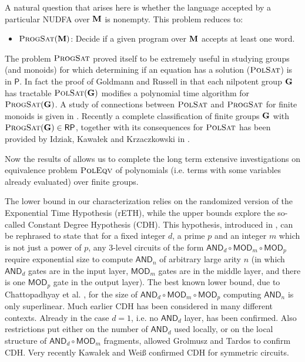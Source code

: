 \documentclass[11pt,a4paper]{amsart}
\newcommand{\polsat}[1]{\textsc{PolSat}\left( {\m #1} \right)}
\newcommand{\ptime}{\textsf{P}\xspace}
\newcommand{\rptime}{\textsf{RP}\xspace}
\newcommand{\m}[1]{{\uppercase {\bf{#1}}}}
\newcommand{\gProblem}[2]{\ensuremath{\operatorname{\textup{\textsc{{#2}}}}
		\ifthenelse{\equal{#1}{}}{}{\!\left( {#1} \right)}}}
\renewcommand{\polsat}[1]{\gProblem{#1}{PolSat}}
\newcommand{\poleqv}[1]{\gProblem{#1}{PolEqv}}
\newcommand{\progpolsat}[1]{\gProblem{#1}{ProgSat}}
\newcommand{\ccand}{\mathsf{AND}}
\newcommand{\ccmod}{\mathsf{MOD}}
\newcommand{\cdhh}{CDH\xspace}
\newcommand{\rethh}{rETH\xspace}
\begin{document}
A natural question that arises here is 
whether the language accepted by a particular NUDFA over $\m M$ is nonempty.
This problem reduces to:
\begin{itemize}
  \item[]$\progpolsat{\m M}$: \quad
        Decide if a given program over $\m M$ accepts at least one word.
\end{itemize}
The problem $\progpolsat{}$ proved itself to be extremely useful in studying groups (and monoids)
for which determining if an equation has a solution (\polsat{}) is in $\ptime$.
In fact the proof of Goldmann and Russell in \cite{GoldmannR02}
that each nilpotent group $\m G$ has tractable $\polsat{\m G}$
modifies a polynomial time algorithm for $\progpolsat{\m G}$.
A study of connections between \polsat{} and \progpolsat{} for finite monoids is given in \cite{BarringtonMMTT00}.
Recently a complete classification of finite groups $\m G$ with $\progpolsat{\m G} \in \rptime$, together with its consequences for \polsat{} has been provided by Idziak, Kawałek and Krzaczkowski in \cite{IdziakKKW22-icalp}.


Now the results of \cite{IdziakKKW22-icalp} allows us to complete the long term extensive investigations \cite{BurrisL04, HorvathS11, FoldvariH19, Weiss20, IdziakKKW22TOCS}
on equivalence problem \poleqv{} of polynomials (i.e. terms with some variables already evaluated) over finite groups.

The lower bound in our characterization relies
on the randomized version of the Exponential Time Hypothesis (\rethh),
while the upper bounds explore the so-called Constant Degree Hypothesis (\cdhh).
This hypothesis, introduced in \cite{BarringtonST90}, can be rephrased to state
that for a fixed integer $d$, a prime $p$ and an integer $m$ which is not just a power of $p$,
any 3-level circuits of the form $\ccand_d\circ\ccmod_m\circ\ccmod_p$
require exponential size to compute $\ccand_n$ of arbitrary large arity $n$ (in which $\ccand_d$ gates are in the input layer, $\ccmod_m$ gates are in the middle layer, and there is one $\ccmod_p$ gate in the output layer). 
The best known lower bound, due to Chattopadhyay et al. \cite{chat-lowerbounds}, 
for the size of $\ccand_d\circ\ccmod_m\circ\ccmod_p$ computing $\ccand_n$
is only superlinear.
Much earlier \cdhh has been considered in many different contexts.
Already in \cite{BarringtonST90} the case $d=1$, i.e. no $\ccand_d$ layer, has been confirmed. 
Also restrictions put either on the number of $\ccand_d$ used locally, 
or on the local structure of $\ccand_d\circ\ccmod_m$ fragments, 
allowed Grolmusz and Tardos \cite{GrolmuszT00, Grolmusz01} to confirm \cdhh. 
Very recently Kawałek and Wei\ss{}  \cite{KW-symmetric-gates} confirmed \cdhh for symmetric circuits. 
\end{document}
